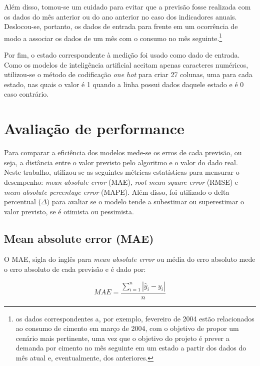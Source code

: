 Além disso, tomou-se um cuidado para evitar que a previsão fosse 
realizada com os dados do mês anterior ou do ano anterior no caso dos
indicadores anuais. Deslocou-se, portanto, os dados de entrada 
para frente em um ocorrência de modo a associar os dados de um 
mês com o consumo no mês seguinte.\footnote{os dados correspondentes 
a, por exemplo, fevereiro de 2004 estão relacionados ao consumo de 
cimento em março de 2004, com o objetivo de propor um cenário mais pertinente, 
uma vez que o objetivo do projeto é prever a demanda por cimento no mês seguinte 
em um estado a partir dos dados do mês atual e, eventualmente, dos anteriores.
}

Por fim, o estado correspondente à medição foi usado como dado de entrada. 
Como os modelos de inteligência artificial aceitam apenas caracteres numéricos,
utilizou-se o método de codificação \textit{one hot} para criar 27 colunas, uma
para cada estado, nas quais o valor é 1 quando a linha possui dados daquele estado 
e é 0 caso contrário.


    \section{Avaliação de performance}

    Para comparar a eficiência dos modelos mede-se os erros de 
    cada previsão, ou seja, a distância entre o valor previsto 
    pelo algoritmo e o valor do dado real. Neste trabalho, 
    utilizou-se as seguintes métricas estatísticas para 
    mensurar o desempenho: \textit{mean absolute error} (MAE),
    \textit{root mean square  error} (RMSE) e \textit{mean 
    absolute percentage error} (MAPE). Além disso, foi utilizado
    o delta percentual ($\Delta$) para avaliar se o modelo tende 
    a subestimar ou superestimar o valor previsto, se é otimista
    ou pessimista.

\subsection{Mean absolute error (MAE)}

    O MAE, sigla do inglês para \textit{mean absolute error}
    ou média do erro absoluto mede o erro absoluto de cada previsão
    e é dado por:\cite{forecast-evaluation-ds}

    \begin{equation}
        MAE = \frac{\sum_{i=1}^n |\hat{y}_i - y_i|}{n}
    \end{equation}

